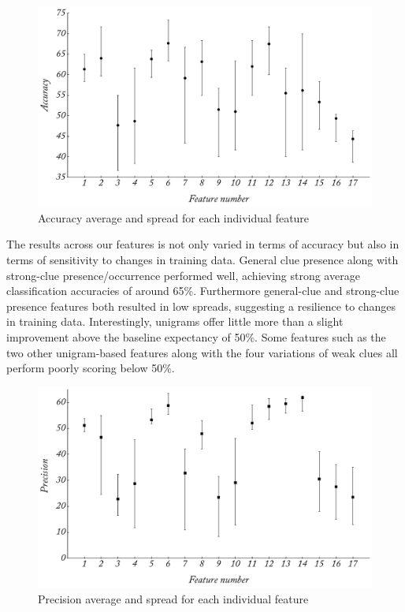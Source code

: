 \begin{figure}
	\caption{Accuracy average and spread for each individual feature}
	\label{fig:polarity_a}
	\centering
		\includegraphics[width=1.0\textwidth]{graphs/polarity_a.pdf}
\end{figure}

The results across our features is not only varied in terms of accuracy but also in terms of sensitivity to changes in training data. General clue presence along with strong-clue presence/occurrence performed well, achieving strong average classification accuracies of around 65\%. Furthermore general-clue and strong-clue presence features both resulted in low spreads, suggesting a resilience to changes in training data. Interestingly, unigrams offer little more than a slight improvement above the baseline expectancy of 50\%. Some features such as the two other unigram-based features along with the four variations of weak clues all perform poorly scoring below 50\%.

\begin{figure}
	\caption{Precision average and spread for each individual feature}
	\label{fig:polarity_p}
	\centering
		\includegraphics[width=1.0\textwidth]{graphs/polarity_p.pdf}
\end{figure}

